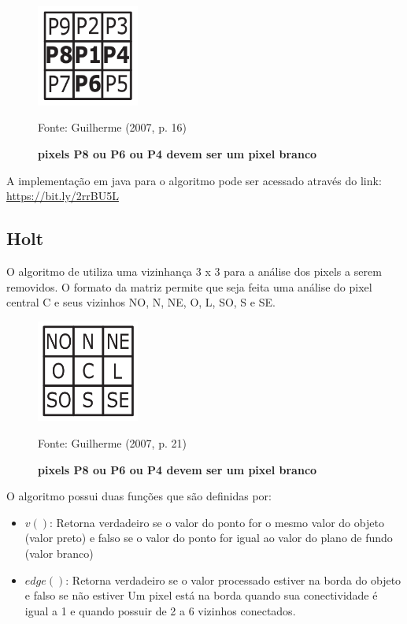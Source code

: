 \documentclass[
	12pt,				%
	oneside,			%
	a4paper,			%
	english,			%
	french,				%
	spanish,			%
	brazil,				%
	]{abntex2}
\begin{document}
\begin{figure}[ht]
\centering
\caption{\textbf{pixels P8 ou P6 ou P4 devem ser um pixel branco}}
\includegraphics[width=0.3\textwidth]{imagens/zhangsuen4.png}

Fonte: Guilherme (2007, p. 16)
\label{fig:zhangsuen4}
\end{figure}

A implementação em java para o algoritmo pode ser acessado através do link: \url{https://bit.ly/2rrBU5L}

\subsection{Holt}    

O algoritmo de \citet{holt1987improved} utiliza uma vizinhança 3 x 3 para a análise dos pixels a serem removidos. O formato da matriz permite que seja feita uma análise do pixel central C e seus vizinhos NO, N, NE, O, L, SO, S e SE.

\begin{figure}[ht]
\centering
\caption{\textbf{pixels P8 ou P6 ou P4 devem ser um pixel branco}}
\includegraphics[width=0.3\textwidth]{imagens/holt.png}

Fonte: Guilherme (2007, p. 21)
\label{fig:holt}
\end{figure}

O algoritmo possui duas funções que são definidas por:

\begin{itemize}
\item \(v()\): Retorna verdadeiro se o valor do ponto for o mesmo valor do objeto (valor preto) e falso se o valor do ponto for igual ao valor do plano de fundo (valor branco)
\item \(edge()\): Retorna verdadeiro se o valor processado estiver na borda do objeto e falso se não estiver
\subitem Um pixel está na borda quando sua conectividade é igual a 1 e quando possuir de 2 a 6 vizinhos conectados. 
\end{itemize}
\end{document}
